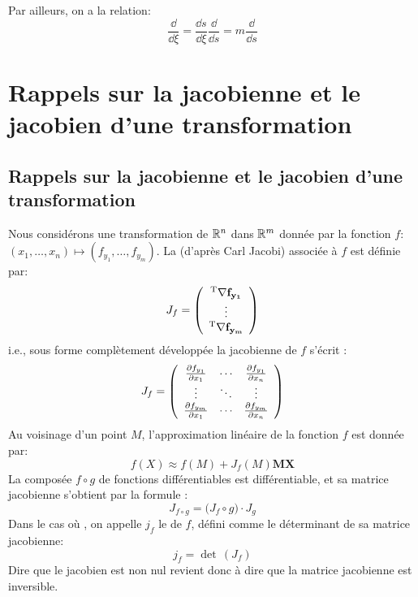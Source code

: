 \medskip
Par ailleurs, on a la relation:
\begin{equation} \frac{\dd}{ \dd \xi} = \frac{\dd s}{ \dd \xi}\frac{\dd}{\dd s}=m\frac{\dd}{\dd s}\end{equation}
\medskip
\ifVersionAvecExemplesSepares
   \section{Rappels sur la jacobienne et le jacobien d'une transformation}
\else
   \subsection{Rappels sur la jacobienne et le jacobien d'une transformation}
\fi

Nous considérons une transformation de $\mathbb R^n$ dans $\mathbb R^m$ donnée par la fonction $f$: 
$\left(x_1, \ldots, x_n \right) \mapsto \left(f_{y_1}, \ldots, f_{y_m} \right)$.
\medskip
La  (d'après Carl Jacobi) 
associée à $f$ est définie par:
\begin{equation}
J_f = \left( \begin{array}{c} {}^\mathrm{T}\mathbf{\nabla f_{y_1}} \\ \vdots \\ {}^\mathrm{T}\mathbf{\nabla f_{y_m}} \end{array}\right)
\end{equation}
i.e., sous forme complètement développée la jacobienne de $f$ s'écrit :
\begin{equation}
J_f = \left( \begin{array}{ccc} \frac{\partial f_{y_1}}{\partial x_1} & \cdots & \frac{\partial f_{y_1}}{\partial x_n} \\ \vdots & \ddots & \vdots \\ \frac{\partial f_{y_m}}{\partial x_1} & \cdots & \frac{\partial f_{y_m}}{\partial x_n} \end{array}\right)
\end{equation}
\medskip
Au voisinage d'un point $M$, l'approximation linéaire de la fonction $f$ est donnée par:
\begin{equation} f\left(X\right) \approx f\left(M\right) + J_f\left(M\right) \mathbf{MX}\end{equation}
\medskip
La composée $f\circ g$ de fonctions différentiables est différentiable, et sa matrice jacobienne 
s'obtient par la formule :
\begin{equation} J_{f \circ g}= \bigl( J_f \circ g \bigr) \cdot J_g\end{equation}
\bigskip
Dans le cas où , on appelle $j_f$ le  de $f$, 
défini comme le déterminant de sa matrice jacobienne: 
\begin{equation} j_f = \det\, \left(J_f \right) \end{equation}
Dire que le jacobien est non nul revient donc à dire que la matrice jacobienne est inversible.


